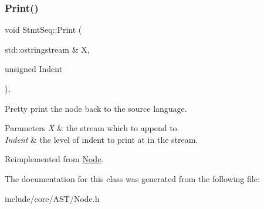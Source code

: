 \subsubsection{\texorpdfstring{Print()}{Print()}}
{\footnotesize\ttfamily void Stmt\+Seq\+::\+Print (\begin{DoxyParamCaption}\item[{std\+::ostringstream \&}]{X,  }\item[{unsigned}]{Indent }\end{DoxyParamCaption})\hspace{0.3cm}{\ttfamily [override]}, {\ttfamily [virtual]}}

Pretty print the node back to the source language. 
\begin{DoxyParams}{Parameters}
{\em X} & the stream which to append to. \\
\hline
{\em Indent} & the level of indent to print at in the stream. \\
\hline
\end{DoxyParams}


Reimplemented from \mbox{\hyperlink{class_node_a5325b760a6e6fe94227c0cff53af2c45}{Node}}.



The documentation for this class was generated from the following file\+:\begin{DoxyCompactItemize}
\item 
include/core/\+A\+S\+T/Node.\+h\end{DoxyCompactItemize}
